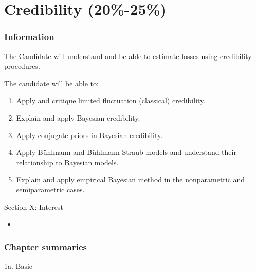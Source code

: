 \chapter[Credibility]{Credibility (20\%-25\%)}

\subsection{Information}

\begin{distributions}[Objective]
The Candidate will understand and be able to estimate losses using credibility procedures.
\end{distributions}

\begin{outcomes}
The candidate will be able to:
\begin{enumerate}[label = \alph*), leftmargin = *]
	\item	Apply and critique limited fluctuation (classical) credibility.
	\item	Explain and apply Bayesian credibility.
	\item	Apply conjugate priors in Bayesian credibility.
	\item	Apply Bühlmann and Bühlmann-Straub models and understand their relationship to Bayesian models.
	\item	Explain and apply empirical Bayesian method in the nonparametric and semiparametric cases.
\end{enumerate}
\end{outcomes}

\begin{ASM_chapter}
Section X: Interest 
\begin{itemize}[leftmargin = *]
	\item	{}
\end{itemize}
\end{ASM_chapter}

\subsection{Chapter summaries}

\begin{CHPT_SUMM_AUTO}[label = {L.-1a}]{1a. Basic}

\end{CHPT_SUMM_AUTO}
